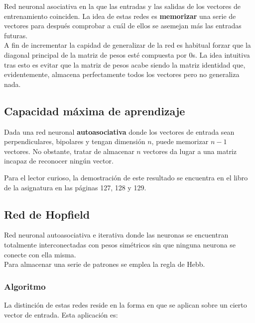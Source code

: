 \begin{defn}
Red neuronal asociativa en la que las entradas y las salidas de los vectores de entrenamiento coinciden. La idea de estas redes es \textbf{memorizar} una serie de vectores para después comprobar a cuál de ellos se asemejan más las entradas futuras.\\

A fin de incrementar la capidad de generalizar de la red es habitual forzar que la diagonal principal de la matriz de pesos esté compuesta por 0s. La idea intuitiva tras esto es evitar que la matriz de pesos acabe siendo la matriz identidad que, evidentemente, almacena perfectamente todos los vectores pero no generaliza nada.
\end{defn}

\subsection{Capacidad máxima de aprendizaje}

\begin{theorem}
Dada una red neuronal \textbf{autoasociativa} donde los vectores de entrada sean perpendiculares, bipolares y tengan dimensión $n$, puede memorizar $n-1$ vectores. No obstante, tratar de almacenar $n$ vectores da lugar a una matriz incapaz de reconocer ningún vector.
\end{theorem}

Para el lector curioso, la demostración de este resultado se encuentra en el libro de la asignatura en las páginas 127, 128 y 129.

\subsection{Red de Hopfield}
\begin{defn}
Red neuronal autoasociativa e iterativa donde las neuronas se encuentran totalmente interconectadas con pesos simétricos sin que ninguna neurona se conecte con ella misma.\\

Para almacenar una serie de patrones se emplea la regla de Hebb.
\end{defn}

\subsubsection{Algoritmo}
La distinción de estas redes reside en la forma en que se aplican sobre un cierto vector de entrada. Esta aplicación es:


